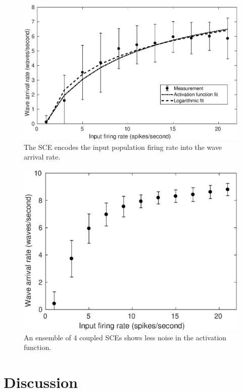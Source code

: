 \documentclass[12pt]{article}
\begin{document}
\begin{figure}[!htb]
 \centering
 \includegraphics[width=\textwidth]{fig/SCE_2x2_FRE}
 \caption{The SCE encodes the input population firing rate into the wave arrival rate. }
 \label{fig:sce_activation_function}
\end{figure}

\begin{figure}[!htb]
 \centering
 \includegraphics[width=\textwidth]{fig/OutputWaveRate_4x4_3p5separations}
 \caption{An ensemble of 4 coupled SCEs shows less noise in the activation function. }
 \label{fig:sce_4x4_coupled_activation_function}
\end{figure}

\section{Discussion}


\clearpage
\printbibliography
\end{document}
